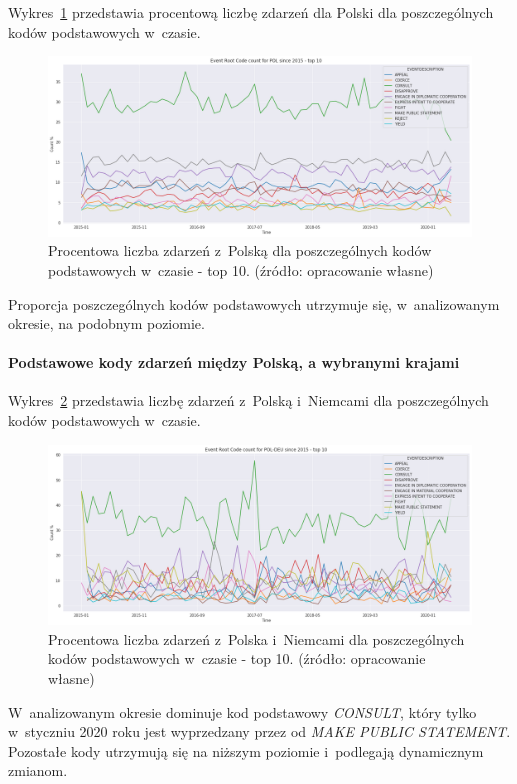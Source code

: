\documentclass[11pt]{report}
\begin{document}
    Wykres~\ref{fig:PLPERCpercinTIME} przedstawia procentową liczbę zdarzeń dla Polski dla poszczególnych kodów podstawowych w~czasie.
    \begin{figure}[!htp]
        \centering
        \includegraphics[width=\linewidth]{fig/PL/PLERCpercinTIME.png}
        \caption{Procentowa liczba zdarzeń z~Polską dla poszczególnych kodów podstawowych w~czasie - top 10. (źródło: opracowanie własne)}
        \label{fig:PLPERCpercinTIME}
    \end{figure}
    Proporcja poszczególnych kodów podstawowych utrzymuje się, w~analizowanym okresie, na podobnym poziomie.

    \paragraph{Podstawowe kody zdarzeń między Polską, a wybranymi krajami}

    Wykres~\ref{fig:PLDEUERC} przedstawia liczbę zdarzeń z~Polską i~Niemcami dla poszczególnych kodów podstawowych w~czasie.
    \begin{figure}[!htp]
        \centering
        \includegraphics[width=\linewidth]{fig/PL/POLDEUERCperc.png}
        \caption{Procentowa liczba zdarzeń z~Polska i~Niemcami dla poszczególnych kodów podstawowych w~czasie - top 10. (źródło: opracowanie własne)}
        \label{fig:PLDEUERC}
    \end{figure}
    W~analizowanym okresie dominuje kod podstawowy \textit{CONSULT}, który tylko w~styczniu 2020 roku jest wyprzedzany przez od \textit{MAKE PUBLIC STATEMENT}.
    Pozostałe kody utrzymują się na niższym poziomie i~podlegają dynamicznym zmianom.
\end{document}
